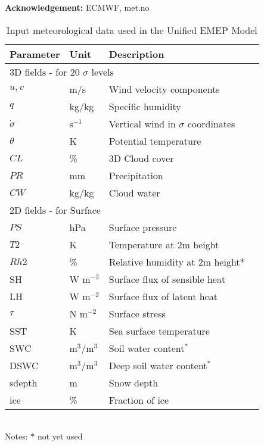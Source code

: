 {\bf Acknowledgement:} ECMWF, met.no

\begin{table}[h!]
\caption{Input meteorological data used in the Unified EMEP Model
   \label{Tab:metinput}}
\begin{center}
\begin{tabular}{p{6cm}lll}
\hline
Parameter      & Unit & Description          \\
\hline
\multicolumn{3}{l}{3D fields - for 20 $\sigma$ levels} \\
$u,v$  &  m/s     & Wind velocity components   \\
$q$    &  kg/kg   & Specific humidity           \\
$\dot{\sigma}$ & s$^{-1}$ & Vertical wind in $\sigma$ coordinates \\
$\theta$       & K  & Potential temperature \\
$CL$             & \% & 3D Cloud cover            \\
$PR$             & mm & Precipitation         \\
$CW$             & kg/kg & Cloud water          \\
\hline
\multicolumn{3}{l}{2D fields - for Surface} \\
$PS$             & hPa & Surface pressure                     \\
$T2$          & K  & Temperature at 2m height               \\
$Rh2$             & \% & Relative humidity at 2m height$\ast$ \\
SH              & W m$^{-2}$ & Surface flux of sensible heat \\
LH             & W m$^{-2}$ & Surface flux of latent heat \\
$\tau$         & N m$^{-2}$ & Surface stress               \\
SST            & K & Sea surface temperature \\
SWC            & m$^3$/m$^{3}$ & Soil water content$^\ast$        \\
DSWC           & m$^3$/m$^{3}$ & Deep soil water content$^\ast$   \\
sdepth         & m & Snow depth \\
ice            & \% & Fraction of ice \\  
\hline
\end{tabular}\\
Notes: $\ast$ not yet used
\end{center}
\end{table}



